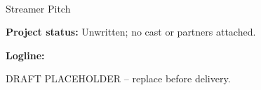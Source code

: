 \documentclass[11pt,letterpaper]{article}
\begin{document}
\begin{center}
{\Large\bfseries\sffamily \filmtitleupper}\\[6pt]
Streamer Pitch
\end{center}
\textbf{Project status:} Unwritten; no cast or partners attached.

\textbf{Logline:} \filmlogline

DRAFT PLACEHOLDER -- replace before delivery.
\end{document}
